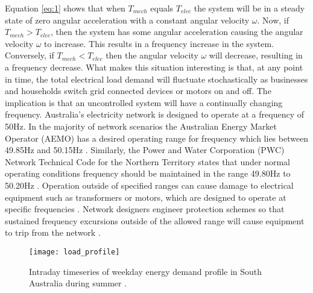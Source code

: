 Equation \ref{eq:1} shows that when $T_{mech}$ equals $T_{elec}$ the system will be in a steady state of zero angular acceleration with a constant angular velocity $\omega$. Now, if $T_{mech} > T_{elec}$, then the system has some angular acceleration causing the angular velocity $\omega$ to increase. This results in a frequency increase in the system. Conversely, if $T_{mech} < T_{elec}$ then the angular velocity $\omega$ will decrease, resulting in a frequency decrease. What makes this situation interesting is that, at any point in time, the total electrical load demand will fluctuate stochastically as businesses and households switch grid connected devices or motors on and off. The implication is that an uncontrolled system will have a continually changing frequency. Australia's electricity network is designed to operate at a frequency of 50$\si{\hertz}$. In the majority of network scenarios the Australian Energy Market Operator (AEMO) has a desired operating range for frequency which lies between 49.85$\si{\hertz}$ and 50.15$\si{\hertz}$ \cite{AEMOfreqdev}. Similarly, the Power and Water Corporation (PWC) Network Technical Code for the Northern Territory states that under normal operating conditions frequency should be maintained in the range 49.80$\si{\hertz}$ to 50.20$\si{\hertz}$ \cite{Pwc2013}. Operation outside of specified ranges can cause damage to electrical equipment such as transformers or motors, which are designed to operate at specific frequencies \cite{Sen2014}. Network designers engineer protection schemes so that sustained frequency excursions outside of the allowed range will cause equipment to trip from the network \cite{AEMOpowerfreqriskrev}.

\begin{figure}[ht]
	\centering
	\texttt{[image: load\_profile]}
	\caption{Intraday timeseries of weekday energy demand profile in South Australia during summer \cite{Aemosaenergyrep}.}
	\label{fig:energydemand}
\end{figure}

